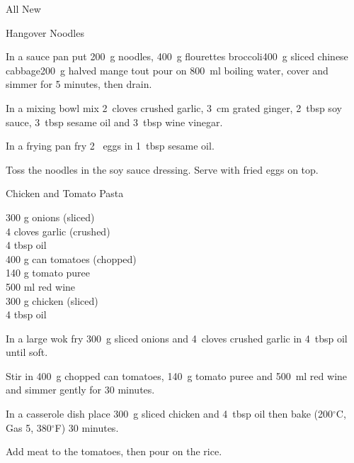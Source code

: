 \begin{menu}{All New}
\begin{recipe}{1}{Hangover Noodles}
\begin{ingredients}
		\end{ingredients}
	
    \begin{instructions}
    \item 
        In a sauce pan
        put
        200~g  noodles,
        400~g flourettes broccoli400~g sliced chinese cabbage200~g halved mange tout
        pour on 800~ml  boiling water,
        cover and simmer for 5 minutes, then drain.
      \item 
        In a mixing bowl mix
        2~cloves crushed garlic,
        3~cm grated ginger,
        2~tbsp  soy sauce,
        3~tbsp  sesame oil and
        3~tbsp  wine vinegar.
      \item 
        In a frying pan fry
        2~  eggs
        in
        1~tbsp  sesame oil.
      \item 
        Toss the noodles in the soy sauce dressing.
        Serve with fried eggs on top.
      
    \end{instructions}
    \end{recipe}%
  
    \begin{recipe}{2}{Chicken and Tomato Pasta}%
    
		\begin{ingredients}
		300 g onions (sliced) \\
	4 cloves garlic (crushed) \\
	4 tbsp oil  \\
	400 g can tomatoes (chopped) \\
	140 g tomato puree  \\
	500 ml red wine  \\
	300 g chicken (sliced) \\
	4 tbsp oil  \\
	
		\end{ingredients}
	
    \begin{instructions}
    \item 
        In a large wok fry
        300~g sliced onions
        and
        4~cloves crushed garlic
        in
        4~tbsp  oil
        until soft.
      \item 
        Stir in
        400~g chopped can tomatoes,
        140~g  tomato puree
        and
        500~ml  red wine
        and simmer gently for 30 minutes.
      \item 
        In a casserole dish place
        300~g sliced chicken
        and
        4~tbsp  oil
        then bake 
      (200$^{\circ}$C, Gas 5, 380$^{\circ}$F)
     30 minutes.
      \item \item 
        Add meat to the tomatoes, then pour on the rice.
      

\end{instructions}
\end{recipe}
\end{menu}
